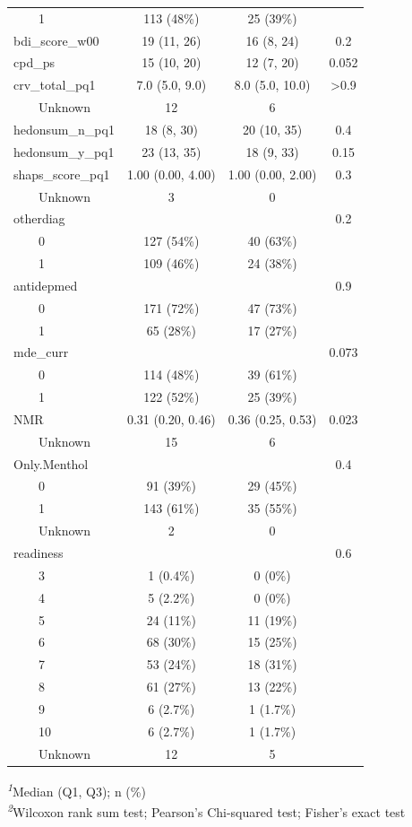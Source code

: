 \documentclass[
  letterpaper,
  DIV=11,
  numbers=noendperiod]{scrartcl}
\begin{document}
\begin{longtable*}{lccc}
    1 & 113 (48\%) & 25 (39\%) &  \\ 
bdi\_score\_w00 & 19 (11, 26) & 16 (8, 24) & 0.2 \\ 
cpd\_ps & 15 (10, 20) & 12 (7, 20) & 0.052 \\ 
crv\_total\_pq1 & 7.0 (5.0, 9.0) & 8.0 (5.0, 10.0) & >0.9 \\ 
    Unknown & 12 & 6 &  \\ 
hedonsum\_n\_pq1 & 18 (8, 30) & 20 (10, 35) & 0.4 \\ 
hedonsum\_y\_pq1 & 23 (13, 35) & 18 (9, 33) & 0.15 \\ 
shaps\_score\_pq1 & 1.00 (0.00, 4.00) & 1.00 (0.00, 2.00) & 0.3 \\ 
    Unknown & 3 & 0 &  \\ 
otherdiag &  &  & 0.2 \\ 
    0 & 127 (54\%) & 40 (63\%) &  \\ 
    1 & 109 (46\%) & 24 (38\%) &  \\ 
antidepmed &  &  & 0.9 \\ 
    0 & 171 (72\%) & 47 (73\%) &  \\ 
    1 & 65 (28\%) & 17 (27\%) &  \\ 
mde\_curr &  &  & 0.073 \\ 
    0 & 114 (48\%) & 39 (61\%) &  \\ 
    1 & 122 (52\%) & 25 (39\%) &  \\ 
NMR & 0.31 (0.20, 0.46) & 0.36 (0.25, 0.53) & 0.023 \\ 
    Unknown & 15 & 6 &  \\ 
Only.Menthol &  &  & 0.4 \\ 
    0 & 91 (39\%) & 29 (45\%) &  \\ 
    1 & 143 (61\%) & 35 (55\%) &  \\ 
    Unknown & 2 & 0 &  \\ 
readiness &  &  & 0.6 \\ 
    3 & 1 (0.4\%) & 0 (0\%) &  \\ 
    4 & 5 (2.2\%) & 0 (0\%) &  \\ 
    5 & 24 (11\%) & 11 (19\%) &  \\ 
    6 & 68 (30\%) & 15 (25\%) &  \\ 
    7 & 53 (24\%) & 18 (31\%) &  \\ 
    8 & 61 (27\%) & 13 (22\%) &  \\ 
    9 & 6 (2.7\%) & 1 (1.7\%) &  \\ 
    10 & 6 (2.7\%) & 1 (1.7\%) &  \\ 
    Unknown & 12 & 5 &  \\ 
\bottomrule
\end{longtable*}
\begin{minipage}{\linewidth}
\textsuperscript{\textit{1}}Median (Q1, Q3); n (\%)\\
\textsuperscript{\textit{2}}Wilcoxon rank sum test; Pearson's Chi-squared test; Fisher's exact test\\
\end{minipage}
\endgroup
\end{document}
